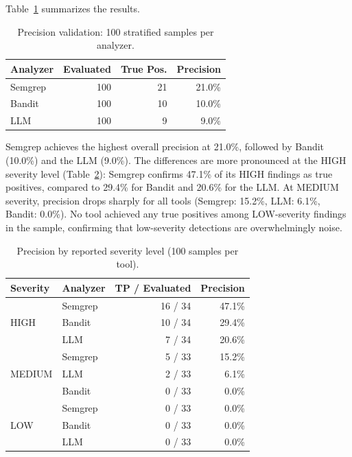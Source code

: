 \documentclass[sigconf,authordraft]{acmart}
\begin{document}
Table~\ref{tab:precision} summarizes the results.

\begin{table}[h]
  \caption{Precision validation: 100 stratified samples per analyzer.}
  \label{tab:precision}
  \begin{tabular}{lrrr}
    \toprule
    Analyzer & Evaluated & True Pos. & Precision \\
    \midrule
    Semgrep  & 100 & 21 & 21.0\% \\
    Bandit   & 100 & 10 & 10.0\% \\
    LLM      & 100 &  9 &  9.0\% \\
    \bottomrule
  \end{tabular}
\end{table}

Semgrep achieves the highest overall precision at 21.0\%, followed by
Bandit (10.0\%) and the LLM (9.0\%). The differences are more
pronounced at the HIGH severity level
(Table~\ref{tab:precision-severity}): Semgrep confirms 47.1\% of its
HIGH findings as true positives, compared to 29.4\% for Bandit and
20.6\% for the LLM. At MEDIUM severity, precision drops sharply for
all tools (Semgrep: 15.2\%, LLM: 6.1\%, Bandit: 0.0\%). No tool
achieved any true positives among LOW-severity findings in the sample,
confirming that low-severity detections are overwhelmingly noise.

\begin{table}[h]
  \caption{Precision by reported severity level (100 samples per tool).}
  \label{tab:precision-severity}
  \begin{tabular}{llrr}
    \toprule
    Severity & Analyzer & TP / Evaluated & Precision \\
    \midrule
    \multirow{3}{*}{HIGH}
      & Semgrep & 16 / 34 & 47.1\% \\
      & Bandit  & 10 / 34 & 29.4\% \\
      & LLM     &  7 / 34 & 20.6\% \\
    \midrule
    \multirow{3}{*}{MEDIUM}
      & Semgrep &  5 / 33 & 15.2\% \\
      & LLM     &  2 / 33 &  6.1\% \\
      & Bandit  &  0 / 33 &  0.0\% \\
    \midrule
    \multirow{3}{*}{LOW}
      & Semgrep &  0 / 33 &  0.0\% \\
      & Bandit  &  0 / 33 &  0.0\% \\
      & LLM     &  0 / 33 &  0.0\% \\
    \bottomrule
  \end{tabular}
\end{table}
\end{document}
